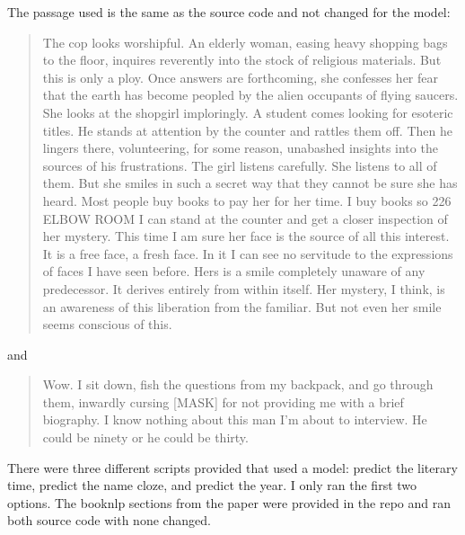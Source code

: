 \documentclass[12pt]{article}
\begin{document}
    \noindent
    The passage used is the same as the source code and not changed for the
    model:
    \begin{quotation}
        The cop looks worshipful. An elderly woman, easing heavy shopping bags to
        the floor, inquires reverently into the stock of religious materials. But
        this is only a ploy. Once answers are forthcoming, she confesses her fear
        that the earth has become peopled by the alien occupants of flying saucers.
        She looks at the shopgirl imploringly. A student comes looking for esoteric
        titles. He stands at attention by the counter and rattles them off. Then he
        lingers there, volunteering, for some reason, unabashed insights into
        the sources of his frustrations. The girl listens carefully. She listens
        to all of them. But she smiles in such a secret way that they cannot be sure
        she has heard. Most people buy books to pay her for her time. I buy books
        so 226 ELBOW ROOM I can stand at the counter and get a closer inspection of
        her mystery. This time I am sure her face is the source of all this
        interest. It is a free face, a fresh face. In it I can see no servitude to
        the expressions of faces I have seen before. Hers is a smile completely
        unaware of any predecessor. It derives entirely from within itself. Her
        mystery, I think, is an awareness of this liberation from the familiar. But
        not even her smile seems conscious of this.
    \end{quotation}
    and
    \begin{quotation}
        Wow. I sit down, fish the questions from my backpack, and go through
        them, inwardly cursing [MASK] for not providing me with a brief biography.
        I know nothing about this man I’m about to interview. He could be ninety or
        he could be thirty.
    \end{quotation}

    There were three different scripts provided that used a model: predict the literary
    time, predict the name cloze, and predict the year. I only ran the first two
    options. The booknlp sections from the paper were provided in the repo and ran
    both source code with none changed.
\end{document}
